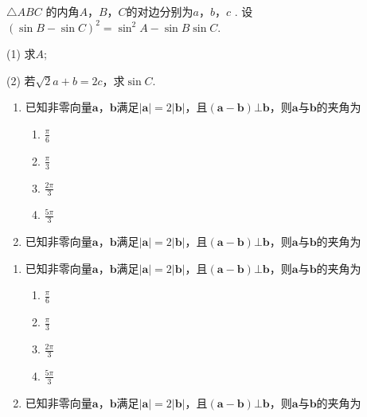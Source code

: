 \documentclass[12pt,a4paper]{exam}
\begin{document}
 
\makeInFo

\begin{questions}
\question

$\triangle ABC$ 的内角$A$，$B$，$C$的对边分别为$a$，$b$，$c$ . 设$(\sin B- \sin C)^2 = \sin^2 A-\sin B \sin C$.

(1) 求$A$;

(2) 若$\sqrt{2} a+b=2c$，求$\sin C$.



\begin{enumerate}
\item 已知非零向量$\mathbf{a}$，$\mathbf{b}$满足$|\mathbf{a}| = 2|\mathbf{b} |$，且$(\mathbf{a}-\mathbf{b}) \bot \mathbf{b}$，则$\mathbf{a}$与$\mathbf{b}$的夹角为
\begin{enumerate}
\item $\frac{\pi}{6} $
\item $\frac{\pi}{3} $
\item $\frac{2\pi}{3} $
\item $\frac{5\pi}{3} $
\end{enumerate}

\item 已知非零向量$\mathbf{a}$，$\mathbf{b}$满足$|\mathbf{a}| = 2|\mathbf{b} |$，且$(\mathbf{a}-\mathbf{b}) \bot \mathbf{b}$，则$\mathbf{a}$与$\mathbf{b}$的夹角为

\end{enumerate}



\begin{enumerate}
\item 已知非零向量$\mathbf{a}$，$\mathbf{b}$满足$|\mathbf{a}| = 2|\mathbf{b} |$，且$(\mathbf{a}-\mathbf{b}) \bot \mathbf{b}$，则$\mathbf{a}$与$\mathbf{b}$的夹角为
\begin{enumerate}
\item $\frac{\pi}{6} $
\item $\frac{\pi}{3} $
\item $\frac{2\pi}{3} $
\item $\frac{5\pi}{3} $
\end{enumerate}

\item 已知非零向量$\mathbf{a}$，$\mathbf{b}$满足$|\mathbf{a}| = 2|\mathbf{b} |$，且$(\mathbf{a}-\mathbf{b}) \bot \mathbf{b}$，则$\mathbf{a}$与$\mathbf{b}$的夹角为



\end{enumerate}
\end{questions}
\end{document}
